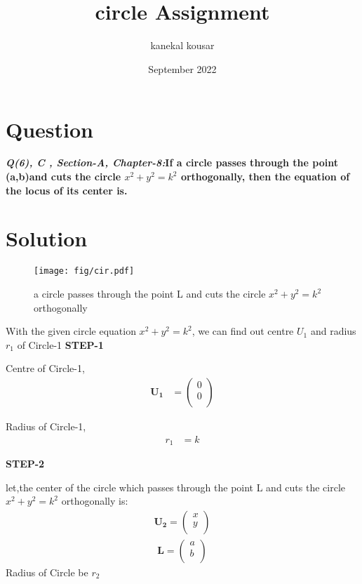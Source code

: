 \documentclass[journal,12pt,twocolumn]{IEEEtran}
\title{\textbf{\\circle Assignment}}
\author{kanekal kousar}
\date{September 2022}
\let\vec\mathbf
\begin{document}
\maketitle


\section{Question}
\textbf{\textit{Q(6), C , Section-A, Chapter-8:}If a circle passes through the point (a,b)and cuts the circle {$x^2+y^2=k^2$} orthogonally, then the equation of the locus of its center is.}

\section{Solution}
\raggedright 

\begin{figure}[h!]
\centering
\texttt{[image: fig/cir.pdf]} \\
\caption{a circle passes through the point L and cuts the circle {$x^2+y^2=k^2$} orthogonally}
\end{figure}

\vspace{0.25cm}
With the given circle equation {$x^2+y^2=k^2$}, we can find out centre \(U_1\) and radius \(r_1\) of Circle-1
\vspace{0.25cm}
\textbf{STEP-1}

Centre of Circle-1,
\boldmath 
\begin{align} 
\vec{U_1} &= \begin{pmatrix}0 \\ 0 \\ \end{pmatrix} 
\end{align}
\unboldmath

Radius of Circle-1,
\boldmath
\begin{align}
 r_1  &= k
\end{align}
\unboldmath

\textbf{STEP-2}

let,the center of the  circle which passes through the point  L and cuts the circle {$x^2+y^2=k^2$} orthogonally is:
\boldmath 
\begin{align} 
\vec{U_2} = \begin{pmatrix}x \\ y \\ \end{pmatrix}
\end{align} 
\begin{align} 
\vec{L}= \begin{pmatrix}a \\ b \\ \end{pmatrix} 
\end{align}
\unboldmath
Radius of Circle be $r_2$
\end{document}
